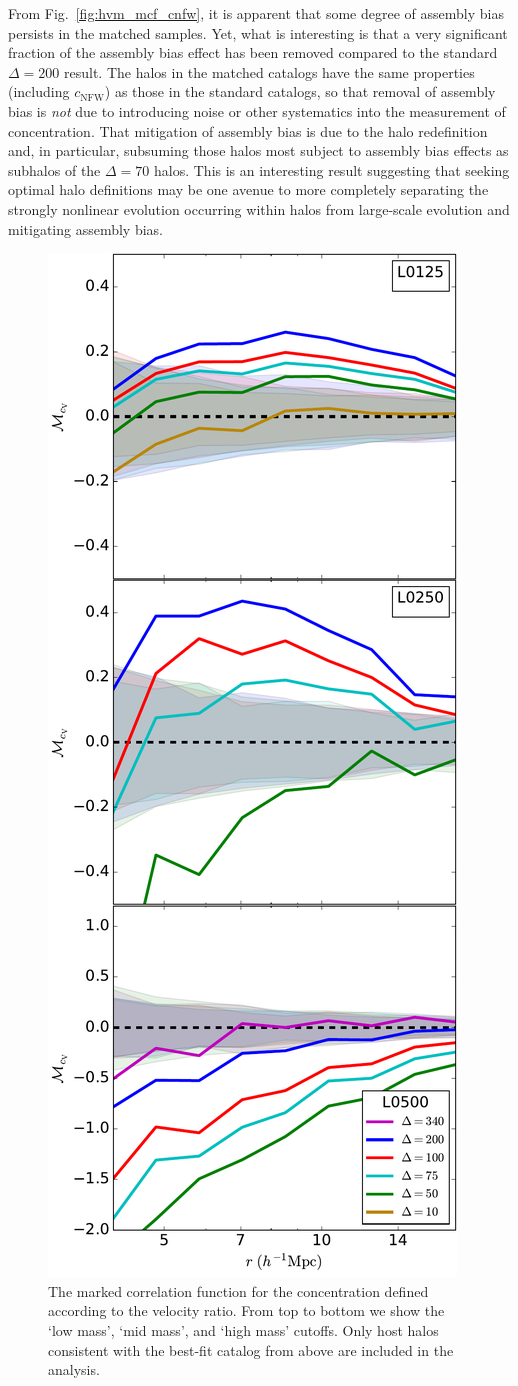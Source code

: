 \documentclass[usenatbib,usegraphicx,letterpaper]{mn2e}
\begin{document}
From Fig.~\ref{fig:hvm_mcf_cnfw}, it is apparent that some degree of assembly bias persists in the matched 
samples. Yet, what is interesting is that a very significant fraction of the assembly bias effect has been 
removed compared to the standard $\Delta=200$ result. The halos in the matched catalogs have the 
same properties (including $c_{\mathrm{NFW}}$) as those in the standard catalogs, so that removal 
of assembly bias is {\em not} due to introducing noise or other systematics into the measurement of 
concentration. That mitigation of assembly bias is due to the halo redefinition and, in particular, 
subsuming those halos most subject to assembly bias effects as subhalos of the $\Delta=70$ 
halos. This is an interesting result suggesting that seeking optimal halo definitions may be 
one avenue to more completely separating the strongly nonlinear evolution occurring within 
halos from large-scale evolution and mitigating assembly bias. 


\begin{figure}
	\centering
	\includegraphics[width=.4\textwidth]{match_mcf_cV.pdf}
	\caption{
	The marked correlation function for the concentration defined according to the velocity ratio. From top to bottom we show the `low mass', `mid mass', and `high mass' cutoffs. Only host halos consistent with the best-fit catalog from above are included in the analysis.}
	\label{fig:hvm_mcf_cV}
\end{figure}
\end{document}
